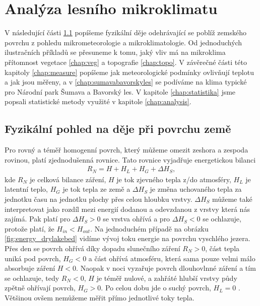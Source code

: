 \chapter{Analýza lesního mikroklimatu}\label{chap:ch1}

V následující části \ref{chap:fyz} popíšeme fyzikální děje odehrávající se poblíž zemského povrchu z pohledu mikrometeorologie a mikroklimatologie. Od jednoduchých ilustračních příkladů se přesuneme k tomu, jaký vliv má na mikroklima přítomnost vegetace \ref{chap:veg} a topografie \ref{chap:topo}. V závěrečné části této kapitoly \ref{chap:measure} popíšeme jak meteorologické podmínky ovlivňují teplotu a jak jsou měřeny, a v \ref{chap:sumavabavorskyles} se podíváme na klima typické pro Národní park Šumava a Bavorský les. V kapitole \ref{chap:statistika} jsme popsali statistické metody využité v kapitole \ref{chap:analysis}.

\section{Fyzikální pohled na děje při povrchu země} \label{chap:fyz}
Pro rovný a téměř homogenní povrch, který můžeme omezit zeshora a zespoda rovinou, platí zjednodušenná rovnice. Tato rovnice vyjadřuje energetickou bilanci \parencite{arya2001}
\begin{gather}\label{eq:bilance}
R_N = H + H_L + H_G + \Delta H_S,
\end{gather}
kde $R_N$ je celková bilance záření, $H$ je tok zjevného tepla z/do atmosféry, $H_L$ je latentní teplo, $H_G$ je tok tepla ze země a $\Delta H_S$ je změna uchovaného tepla za jednotku času na jednotku plochy přes celou hloubku vrstvy. $\Delta H_S$ můžeme také interpretovat jako rozdíl mezi energií dodanou a odevzdanou z vrstvy která nás zajímá. Pak platí pro $\Delta H_S>0$ se vrstva ohřívá a pro $\Delta H_S<0$ se ochlazuje, protože platí, že $H_{in}<H_{out}$. Na jednoduchém případě na obrázku \ref{fig:energy_drylakebed} vidíme vývoj toku energie na povrchu vyschlého jezera. Přes den se povrch ohřívá díky dopadu slunečního záření $R_N>0$, část tepla uniká pod povrch, $H_G<0$ a část ohřívá atmosféru, která sama pouze velmi málo absorbuje záření $H<0$. Naopak v noci vyzařuje povrch dlouhovlnné záření a tím se ochlazuje, tedy $R_N<0$, $H$ je téměř nulové, a zahřáté hlubší vrstvy půdy zpětně ohřívají povrch, $H_G>0$. Po celou dobu jde o suchý povrch, $H_L=0$ \parencite{arya2001}. Většinou ovšem nemůžeme měřit přímo jednotlivé toky tepla.

